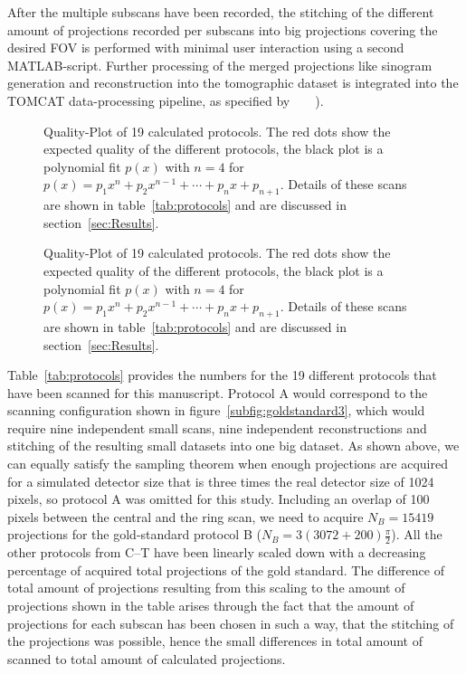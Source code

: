 After the multiple subscans have been recorded, the stitching of the different amount of projections recorded per subscans into big projections covering the desired FOV is performed with minimal user interaction using a second MATLAB-script. Further processing of the merged projections like sinogram generation and reconstruction into the tomographic dataset is integrated into the TOMCAT data-processing pipeline, as specified by%
\ifhtml
	~\citet{Hintermueller2009}
\else
	~
\fi%
).

\ifiucr
	\begin{figure}%
		\centering%
		\caption{Quality-Plot of 19 calculated protocols. The red dots show the expected quality of the different protocols, the black plot is a polynomial fit $p(x)$ with $n=4$ for $p(x)=p_{1}x^{n}+p_{2}x^{n-1}+\cdots+p_{n}x+p_{n+1}$. Details of these scans are shown in table~\ref{tab:protocols} and are discussed in section~\ref{sec:Results}.}%
		\label{fig:qualityplot}%
	\end{figure}%
\else
\begin{figure*}[htp]
	\centering%
	\caption{Quality-Plot of 19 calculated protocols. The red dots show the expected quality of the different protocols, the black plot is a polynomial fit $p(x)$ with $n=4$ for $p(x)=p_{1}x^{n}+p_{2}x^{n-1}+\cdots+p_{n}x+p_{n+1}$. Details of these scans are shown in table~\ref{tab:protocols} and are discussed in section~\ref{sec:Results}.}%
	\label{fig:qualityplot}%
	\end{figure*}
\fi

Table~\ref{tab:protocols} provides the numbers for the 19 different protocols that have been scanned for this manuscript. Protocol A would correspond to the scanning configuration shown in figure~\ref{subfig:goldstandard3}, which would require nine independent small scans, nine independent reconstructions and stitching of the resulting small datasets into one big dataset. As shown above, we can equally satisfy the sampling theorem when enough projections are acquired for a simulated detector size that is three times the real detector size of 1024 pixels, so protocol A was omitted for this study. Including an overlap of 100 pixels between the central and the ring scan, we need to acquire $N_{B}=15419$ projections for the gold-standard protocol B ($N_{B}=3(3072+200)\frac{\pi}{2}$). All the other protocols from C--T have been linearly scaled down with a decreasing percentage of acquired total projections of the gold standard. The difference of total amount of projections resulting from this scaling to the amount of projections shown in the table arises through the fact that the amount of projections for each subscan has been chosen in such a way, that the stitching of the projections was possible, hence the small differences in total amount of scanned to total amount of calculated projections.

